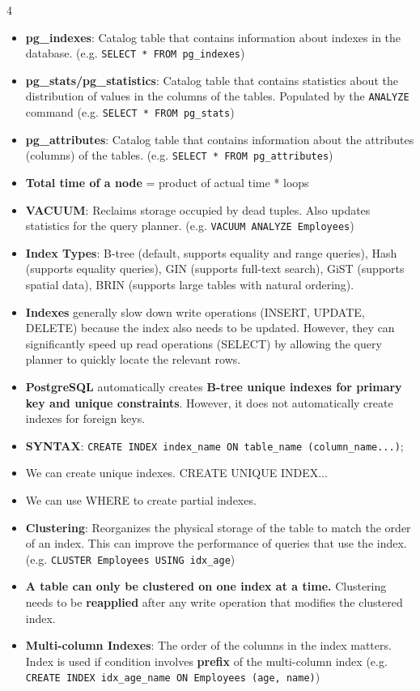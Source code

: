 \documentclass[10pt, landscape]{article}
\begin{document}
\begin{multicols*}{4}
\begin{itemize}
    \item \textbf{pg\_indexes}: Catalog table that contains information about indexes in the database. (e.g. \texttt{SELECT * FROM pg\_indexes})
    \item \textbf{pg\_stats/pg\_statistics}: Catalog table that contains statistics about the distribution of values in the columns of the tables. Populated by the \texttt{ANALYZE} command (e.g. \texttt{SELECT * FROM pg\_stats})
    \item \textbf{pg\_attributes}: Catalog table that contains information about the attributes (columns) of the tables. (e.g. \texttt{SELECT * FROM pg\_attributes})
    \item \textbf{Total time of a node} = product of actual time * loops
    \item \textbf{VACUUM}: Reclaims storage occupied by dead tuples. Also updates statistics for the query planner. (e.g. \texttt{VACUUM ANALYZE Employees})
    \item \textbf{Index Types}: B-tree (default, supports equality and range queries), Hash (supports equality queries), GIN (supports full-text search), GiST (supports spatial data), BRIN (supports large tables with natural ordering).
    \item \textbf{Indexes} generally slow down write operations (INSERT, UPDATE, DELETE) because the index also needs to be updated. However, they can significantly speed up read operations (SELECT) by allowing the query planner to quickly locate the relevant rows.
    \item \textbf{PostgreSQL} automatically creates \textbf{B-tree unique indexes for primary key and unique constraints}. However, it does not automatically create indexes for foreign keys.
    \item \textbf{SYNTAX}: \texttt{CREATE INDEX index\_name ON table\_name (column\_name...)};
    \item We can create unique indexes. CREATE UNIQUE INDEX...
    \item We can use WHERE to create partial indexes.
    \item \textbf{Clustering}: Reorganizes the physical storage of the table to match the order of an index. This can improve the performance of queries that use the index. (e.g. \texttt{CLUSTER Employees USING idx\_age})
    \item \textbf{A table can only be clustered on one index at a time.} Clustering needs to be \textbf{reapplied} after any write operation that modifies the clustered index.
    \item \textbf{Multi-column Indexes}: The order of the columns in the index matters. Index is used if condition involves \textbf{prefix} of the multi-column index (e.g. \texttt{CREATE INDEX idx\_age\_name ON Employees (age, name)})
   \end{itemize}


\end{multicols*}
\end{document}
